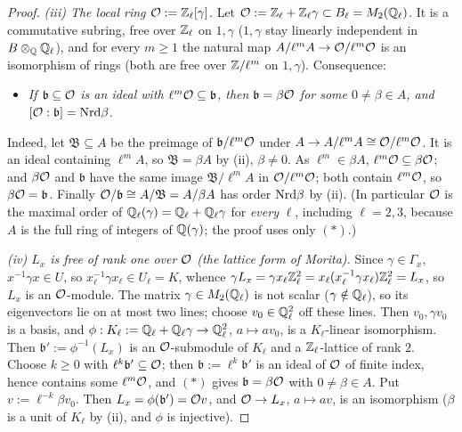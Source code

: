 \begin{proof}
\emph{(iii) The local ring $\mathcal{O}:=\mathbb{Z}_\ell[\gamma]$.} Let $\mathcal{O}:=\mathbb{Z}_\ell+\mathbb{Z}_\ell\gamma\subset B_\ell=M_2(\mathbb{Q}_\ell)$. It is a commutative subring, free over $\mathbb{Z}_\ell$ on $1,\gamma$
($1,\gamma$ stay linearly independent in $B\otimes_{\mathbb{Q}}\mathbb{Q}_\ell$), and for every $m\ge1$ the natural map $A/\ell^mA\to\mathcal{O}/\ell^m\mathcal{O}$ is an isomorphism of rings
(both are free over $\mathbb{Z}/\ell^m$ on $1,\gamma$). Consequence:
\begin{itemize}
\item[$(*)$] \emph{If $\mathfrak b\subseteq\mathcal{O}$ is an ideal with $\ell^m\mathcal{O}\subseteq\mathfrak b$, then $\mathfrak b=\beta\mathcal{O}$ for some $0\ne\beta\in A$, and $[\mathcal{O}:\mathfrak b]=\mathrm{Nrd}\beta$.}
\end{itemize}
Indeed, let $\mathfrak B\subseteq A$ be the preimage of $\mathfrak b/\ell^m\mathcal{O}$ under $A\to A/\ell^mA\cong\mathcal{O}/\ell^m\mathcal{O}$. It is an ideal containing $\ell^mA$, so
$\mathfrak B=\beta A$ by (ii), $\beta\ne0$. As $\ell^m\in\beta A$, $\ell^m\mathcal{O}\subseteq\beta\mathcal{O}$; and $\beta\mathcal{O}$ and $\mathfrak b$ have the same image $\mathfrak B/\ell^mA$ in
$\mathcal{O}/\ell^m\mathcal{O}$; both contain $\ell^m\mathcal{O}$, so $\beta\mathcal{O}=\mathfrak b$. Finally $\mathcal{O}/\mathfrak b\cong A/\mathfrak B=A/\beta A$ has order $\mathrm{Nrd}\beta$ by (ii).
(In particular $\mathcal{O}$ is the maximal order of $\mathbb{Q}_\ell(\gamma)=\mathbb{Q}_\ell+\mathbb{Q}_\ell\gamma$ for \emph{every} $\ell$, including $\ell=2,3$, because $A$ is the full ring of
integers of $\mathbb{Q}(\gamma)$; the proof uses only $(*)$.)

\emph{(iv) $L_x$ is free of rank one over $\mathcal{O}$ (the lattice form of Morita).} Since $\gamma\in\Gamma_x$, $x^{-1}\gamma x\in U$, so
$x_\ell^{-1}\gamma x_\ell\in U_\ell=K$, whence $\gamma L_x=\gamma x_\ell\mathbb{Z}_\ell^2=x_\ell(x_\ell^{-1}\gamma x_\ell)\mathbb{Z}_\ell^2=L_x$, so $L_x$ is an $\mathcal{O}$-module. The matrix $\gamma\in M_2(\mathbb{Q}_\ell)$ is not scalar ($\gamma\notin\mathbb{Q}_\ell$), so its
eigenvectors lie on at most two lines; choose $v_0\in\mathbb{Q}_\ell^2$ off these lines. Then $v_0,\gamma v_0$ is a basis, and
$\phi:K_\ell:=\mathbb{Q}_\ell+\mathbb{Q}_\ell\gamma\to\mathbb{Q}_\ell^2$, $a\mapsto av_0$, is a $K_\ell$-linear isomorphism. Then $\mathfrak b':=\phi^{-1}(L_x)$ is an $\mathcal{O}$-submodule of $K_\ell$ and
a $\mathbb{Z}_\ell$-lattice of rank $2$. Choose $k\ge0$ with $\ell^k\mathfrak b'\subseteq\mathcal{O}$; then $\mathfrak b:=\ell^k\mathfrak b'$ is an ideal of $\mathcal{O}$ of finite index, hence
contains some $\ell^m\mathcal{O}$, and $(*)$ gives $\mathfrak b=\beta\mathcal{O}$ with $0\ne\beta\in A$. Put $v:=\ell^{-k}\beta v_0$. Then $L_x=\phi(\mathfrak b')=\mathcal{O} v$, and
$\mathcal{O}\to L_x$, $a\mapsto av$, is an isomorphism ($\beta$ is a unit of $K_\ell$ by (ii), and $\phi$ is injective).


\end{proof}
